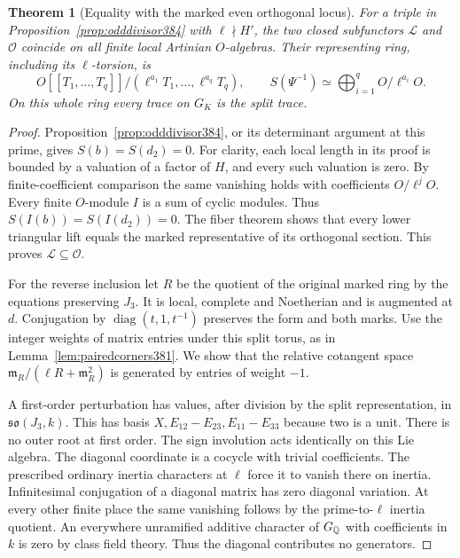 \documentclass[a4paper,11pt]{article}
\newtheorem{theorem}[proposition]{Theorem}
\theoremstyle{definition}
\theoremstyle{remark}
\numberwithin{equation}{section}
\begin{document}
\begin{theorem}[Equality with the marked even orthogonal locus]
\label{thm:orthcollapse384}
For a triple in Proposition~\ref{prop:odddivisor384} with
\(\ell\nmid H'\), the two closed subfunctors \(\mathcal L\)
and \(\mathcal O\) coincide on all finite local Artinian
\(O\)-algebras. Their representing ring, including its
\(\ell\)-torsion, is
\[
  O[[T_1,\ldots,T_q]]/(\ell^{a_1}T_1,\ldots,\ell^{a_q}T_q),
 \qquad
 S(\Psi^{-1})\simeq\bigoplus_{i=1}^q O/\ell^{a_i}O .
\]
On this whole ring every trace on \(G_K\) is the split trace.
\end{theorem}
\begin{proof}
Proposition~\ref{prop:odddivisor384}, or its determinant argument
at this prime, gives \(S(b)=S(d_2)=0\). For clarity, each
local length in its proof is bounded by a valuation of a factor
of \(H\), and every such valuation is zero. By finite-coefficient
comparison the same vanishing holds with coefficients \(O/\ell^jO\).
Every finite \(O\)-module \(I\) is a sum of cyclic modules.
Thus \(S(I(b))=S(I(d_2))=0\). The fiber theorem shows that
every lower triangular lift equals the marked representative
of its orthogonal section. This proves \(\mathcal L\subseteq
\mathcal O\).

For the reverse inclusion let \(R\) be the quotient of the
original marked ring by the equations preserving \(J_3\).
It is local, complete and Noetherian and is augmented at \(d\).
Conjugation by \(\operatorname{diag}(t,1,t^{-1})\) preserves
the form and both marks. Use the integer weights of matrix
entries under this split torus, as in
Lemma~\ref{lem:pairedcorners381}. We show that the relative
cotangent space \(\mathfrak m_R/(\ell R+\mathfrak m_R^2)\)
is generated by entries of weight \(-1\).

A first-order perturbation has values, after division by
the split representation, in \(\mathfrak{so}(J_3,k)\).
This has basis \(X,E_{12}-E_{23},E_{11}-E_{33}\) because
two is a unit. There is no outer root at first order.
The sign involution acts identically on this Lie algebra.
The diagonal coordinate is a cocycle with trivial coefficients.
The prescribed ordinary inertia characters at \(\ell\) force
it to vanish there on inertia. Infinitesimal conjugation of a
diagonal matrix has zero diagonal variation. At every other
finite place the same vanishing follows by the prime-to-\(\ell\)
inertia quotient. An everywhere unramified additive character
of \(G_\mathbb Q\) with coefficients in \(k\) is zero by class field
theory. Thus the diagonal contributes no generators.


\end{proof}
\end{document}

